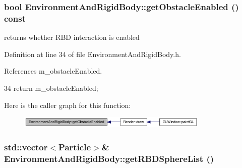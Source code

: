 \hypertarget{class_environment_and_rigid_body_ad9b64871e62d1cc242683d4bcb785930}{
\subsubsection[{getObstacleEnabled}]{\setlength{\rightskip}{0pt plus 5cm}bool EnvironmentAndRigidBody::getObstacleEnabled () const}}
\label{class_environment_and_rigid_body_ad9b64871e62d1cc242683d4bcb785930}


returns whether RBD interaction is enabled 



Definition at line 34 of file EnvironmentAndRigidBody.h.



References m\_\-obstacleEnabled.




\begin{DoxyCode}
34 { return m_obstacleEnabled; }
\end{DoxyCode}




Here is the caller graph for this function:\nopagebreak
\begin{figure}[H]
\begin{center}
\leavevmode
\includegraphics[width=259pt]{class_environment_and_rigid_body_ad9b64871e62d1cc242683d4bcb785930_icgraph}
\end{center}
\end{figure}


\hypertarget{class_environment_and_rigid_body_ab8f19c02935c0763d700dadf8ff4c097}{
\subsubsection[{getRBDSphereList}]{\setlength{\rightskip}{0pt plus 5cm}std::vector$<${\bf Particle}$>$\& EnvironmentAndRigidBody::getRBDSphereList ()}}
\label{class_environment_and_rigid_body_ab8f19c02935c0763d700dadf8ff4c097}


